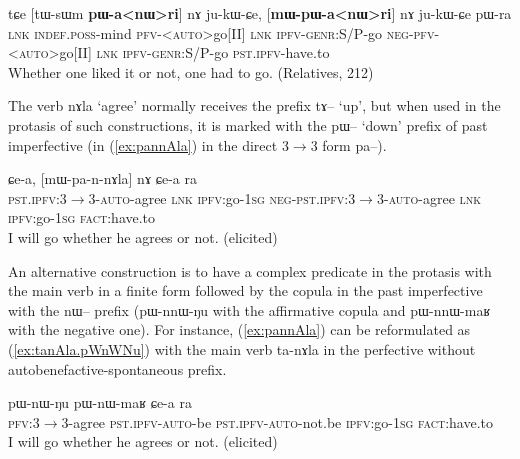 \documentclass[oldfontcommands,oneside,a4paper,11pt]{article}
\newcommand{\ipa}[1]{{\phon \mbox{#1}}} %
\newcommand{\refb}[1]{(\ref{#1})}
\begin{document}
\begin{exe}
\ex  \label{ex:pannWri}
\gll
\ipa{tɕe}  	[\ipa{tɯ-sɯm}  	\textbf{\ipa{pɯ-a<nɯ>ri}}]  	\ipa{nɤ}  	\ipa{ju-kɯ-ɕe,}  	[\textbf{\ipa{mɯ-pɯ-a<nɯ>ri}}]  	\ipa{nɤ}  	\ipa{ju-kɯ-ɕe}  	\ipa{pɯ-ra}  \\
\textsc{lnk} \textsc{indef.poss}-mind  \textsc{pfv-<auto>}go[II] \textsc{lnk} \textsc{ipfv-genr}:S/P-go \textsc{neg-pfv-<auto>}go[II] \textsc{lnk} \textsc{ipfv-genr}:S/P-go \textsc{pst.ipfv}-have.to \\
\glt Whether one liked it or not, one had to go. (Relatives, 212)
\end{exe}

The verb \ipa{nɤla} `agree' normally receives the prefix \ipa{tɤ}-- `up', but when used in the protasis of such constructions, it is marked with the \ipa{pɯ}-- `down' prefix of past imperfective (in \refb{ex:pannAla} in the direct 3$\rightarrow$3 form \ipa{pa}--).

\begin{exe}
\ex  \label{ex:pannAla}
\gll
[\ipa{pa-n-nɤla}]   	\ipa{nɤ}   	\ipa{ɕe-a,}   	[\ipa{mɯ-pa-n-nɤla}]   	\ipa{nɤ}   	\ipa{ɕe-a}   	\ipa{ra}   \\
 \textsc{pst.ipfv}:3$\rightarrow$3-\textsc{auto}-agree \textsc{lnk} \textsc{ipfv}:go-\textsc{1sg}
  \textsc{neg-pst.ipfv}:3$\rightarrow$3-\textsc{auto}-agree \textsc{lnk} \textsc{ipfv}:go-\textsc{1sg} \textsc{fact}:have.to \\
\glt I will go whether he agrees or not. (elicited)
\end{exe}
 An alternative construction is to have a  complex predicate in the protasis with the main verb in a finite form followed by the copula in the past imperfective with the \ipa{nɯ}-- prefix (\ipa{pɯ-nnɯ-ŋu} with the affirmative copula and \ipa{pɯ-nnɯ-maʁ} with the negative one). For instance, \refb{ex:pannAla} can be reformulated as \refb{ex:tanAla.pWnWNu} with the main verb \ipa{ta-nɤla} in the perfective without autobenefactive-spontaneous prefix.
 
\begin{exe}
\ex  \label{ex:tanAla.pWnWNu}
\gll  \ipa{ta-nɤla}   	\ipa{pɯ-nɯ-ŋu}   	\ipa{pɯ-nɯ-maʁ}   	\ipa{ɕe-a}   	\ipa{ra}   \\
\textsc{pfv}:3$\rightarrow$3-agree \textsc{pst.ipfv-auto}-be \textsc{pst.ipfv-auto}-not.be \textsc{ipfv}:go-\textsc{1sg} \textsc{fact}:have.to \\
\glt I will go whether he agrees or not. (elicited)
\end{exe}
\end{document}
